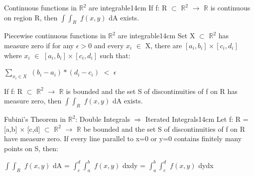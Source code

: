     \vspace{0.5cm}



    \begin{wtheorem}{Continuous functions in $\mathbb{R}^2$ are integrable}{14cm}
        If f: R $\subset$ $\mathbb{R}^2$ $\rightarrow$ $\mathbb{R}$
        is continuous on region R, then $\int \int_R$ $f(x,y)$ dA exists.
    \end{wtheorem}

    \vspace{0.5cm}



    \begin{wtheorem}{Piecewise continuous functions in $\mathbb{R}^2$
    are integrable}{14cm}
        Set X $\subset$ $\mathbb{R}^2$ has {\color{lblue} measure zero}
        if for any $\epsilon > 0$ and every $x_i$ $\in$ X, there are
        $[a_i,b_i] \times [c_i,d_i]$ where $x_i$ $\in$
        $[a_i,b_i] \times [c_i,d_i]$ such that:

        \hspace{0.5cm}
        $\sum_{x_i \in X}$ $(b_i - a_i)*(d_i - c_i)$ $<$ $\epsilon$

        \vspace{0.3cm}
        
        If f: R $\subset$ $\mathbb{R}^2$ $\rightarrow$ $\mathbb{R}$
        is bounded and the set S of discontinuities of f on R
        has measure zero, then $\int \int_R$ $f(x,y)$ dA exists.
    \end{wtheorem}

    \vspace{0.5cm}



    \begin{wtheorem}{Fubini's Theorem in $\mathbb{R}^2$:
    Double Integrals $\Rightarrow$ Iterated Integrals}{14cm}
        Let f: R = [a,b] $\times$ [c,d] $\subset$ $\mathbb{R}^2$
        $\rightarrow$ $\mathbb{R}$ be bounded and the set S of
        discontinuities of f on R have measure zero.
        If every line parallel to x=0 or y=0 contains finitely
        many points on S, then:

        \hspace{0.5cm}
        $\int \int_R$ $f(x,y)$ dA
        = $\int_c^d \int_a^b$ $f(x,y)$ dxdy
        = $\int_a^b \int_c^d$ $f(x,y)$ dydx 
    \end{wtheorem}

    \vspace{0.5cm}



